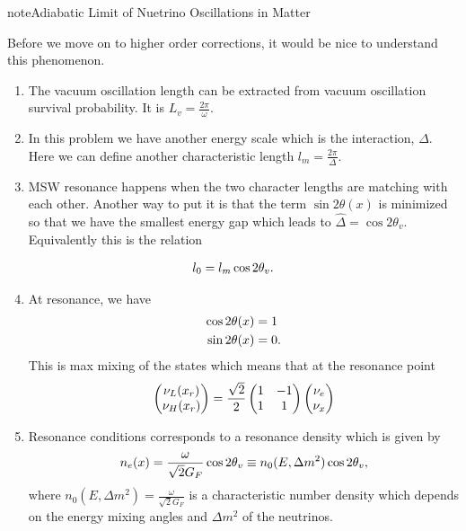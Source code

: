 \documentclass[letterpaper,12pt,english]{sphinxmanual}
\begin{document}
\begin{notice}{note}{Adiabatic Limit of Nuetrino Oscillations in Matter}

Before we move on to higher order corrections, it would be nice to understand this phenomenon.
\begin{enumerate}
\item {} 
The vacuum oscillation length can be extracted from vacuum oscillation survival probability. It is \(L_v = \frac{2\pi}{\omega}\).

\item {} 
In this problem we have another energy scale which is the interaction, \(\Delta\). Here we can define another characteristic length \(l_m = \frac{2\pi}{\Delta}\).

\item {} 
MSW resonance happens when the two character lengths are matching with each other. Another way to put it is that the term \(\sin 2\theta(x)\) is minimized so that we have the smallest energy gap which leads to \(\hat\Delta = \cos 2\theta_v\). Equivalently this is the relation

\end{enumerate}
\begin{gather}
\begin{split}l_0 = l_m\cos 2\theta_v.\end{split}\notag
\end{gather}\begin{enumerate}
\setcounter{enumi}{3}
\item {} 
At resonance, we have
\begin{gather}
\begin{split}\cos 2\theta(x) &= 1 \\
\sin 2\theta(x) &= 0.\end{split}\notag
\end{gather}
This is max mixing of the states which means that at the resonance point
\begin{gather}
\begin{split}\begin{pmatrix} \nu_L(x_{r}) \\ \nu_H(x_{r}) \end{pmatrix} = \frac{\sqrt{2}}{2}\begin{pmatrix} 1 & -1 \\ 1 & 1 \end{pmatrix} \begin{pmatrix}\nu_e \\ \nu_x \end{pmatrix}\end{split}\notag
\end{gather}
\item {} 
Resonance conditions corresponds to a resonance density which is given by
\begin{gather}
\begin{split}n_e(x) = \frac{\omega}{\sqrt{2}G_F } \cos 2\theta_v \equiv n_0(E,\Delta m^2) \cos 2\theta_v,\end{split}\notag
\end{gather}
where \(n_0(E,\Delta m^2)=\frac{\omega}{\sqrt{2}G_F }\) is a characteristic number density which depends on the energy mixing angles and \(\Delta m^2\) of the neutrinos.


\end{enumerate}
\end{notice}
\end{document}
